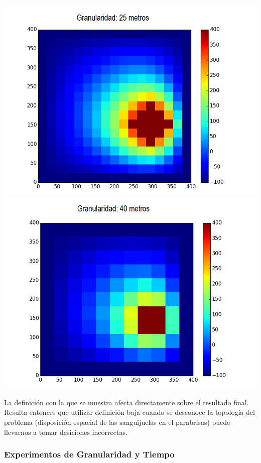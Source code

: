 	\begin{center}
		\includegraphics[scale=0.5]{./img/temp_punto_critico/granularidad25.png}
		\includegraphics[scale=0.5]{./img/temp_punto_critico/granularidad40.png}
	\end{center}

	La definición con la que se muestra afecta directamente sobre el resultado final. Resulta entonces que utilizar definición baja cuando se desconoce la topología del problema (disposición espacial de las sanguijuelas en el parabrisas) puede llevarnos a tomar desiciones incorrectas.

\newpage
\subsubsection{Experimentos de Granularidad y Tiempo}	

